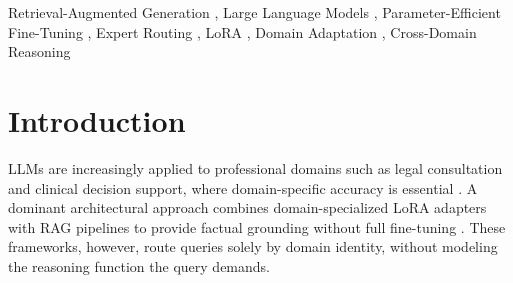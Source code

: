 \documentclass[a4paper,fleql]{cas-sc}
\begin{document}
\begin{keywords}
Retrieval-Augmented Generation \sep
Large Language Models \sep
Parameter-Efficient Fine-Tuning \sep
Expert Routing \sep
LoRA \sep
Domain Adaptation \sep
Cross-Domain Reasoning
\end{keywords}
\maketitle

\section{Introduction}
\label{sec:introduction}

LLMs are increasingly applied to professional domains such as legal
consultation and clinical decision support, where domain-specific accuracy
is essential \citep{brown2020gpt,touvron2023llama,singhal2023large}.
A dominant architectural approach combines domain-specialized LoRA adapters
with RAG pipelines to provide factual grounding without full fine-tuning
\citep{hu2022lora,shazeer2017outrageously,dou2024loramoe}. These frameworks,
however, route queries solely by domain identity, without modeling the
reasoning function the query demands.
\end{document}
